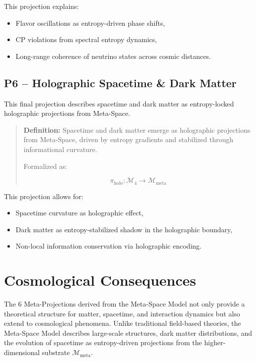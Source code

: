 \documentclass[10.5pt,a4paper]{article}
\begin{document}
This projection explains:
\begin{itemize}
    \item Flavor oscillations as entropy-driven phase shifts,
    \item CP violations from spectral entropy dynamics,
    \item Long-range coherence of neutrino states across cosmic distances.
\end{itemize}

\subsection{P6 – Holographic Spacetime \& Dark Matter}

This final projection describes spacetime and dark matter as entropy-locked holographic projections from Meta-Space.

\begin{quote}
\textbf{Definition:}  
Spacetime and dark matter emerge as holographic projections from Meta-Space, driven by entropy gradients 
and stabilized through informational curvature.

Formalized as:

\[
\pi_{\text{holo}}: \mathcal{M}_4 \rightarrow \mathcal{M}_{\text{meta}}
\]
\end{quote}

This projection allows for:
\begin{itemize}
    \item Spacetime curvature as holographic effect,
    \item Dark matter as entropy-stabilized shadow in the holographic boundary,
    \item Non-local information conservation via holographic encoding.
\end{itemize}

\clearpage

\section{Cosmological Consequences}

The 6 Meta-Projections derived from the Meta-Space Model not only provide a theoretical structure for matter, spacetime, and interaction dynamics but also extend to cosmological phenomena. Unlike traditional field-based theories, the Meta-Space Model describes large-scale structures, dark matter distributions, and the evolution of spacetime as entropy-driven projections from the higher-dimensional substrate \(\mathcal{M}_{\text{meta}}\).
\end{document}
